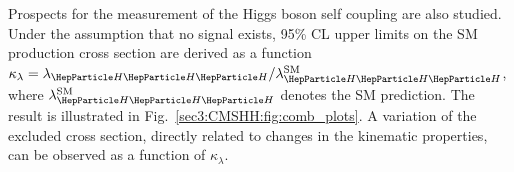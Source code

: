 

Prospects for the measurement of the Higgs boson self coupling are also studied.
Under the assumption that no \HH signal exists, 95\% CL upper limits on the SM \HH production cross section are derived as a function $\kappa_\lambda = \lambdahhh/\lambdahhh^\text{SM}$, where $\lambdahhh^\text{SM}$ denotes the SM prediction. 
The result is illustrated in Fig.~\ref{sec3:CMSHH:fig:comb_plots}.
A variation of the excluded cross section, directly related to changes in the \HH kinematic properties, can be observed as a function of $\kappa_\lambda$.


